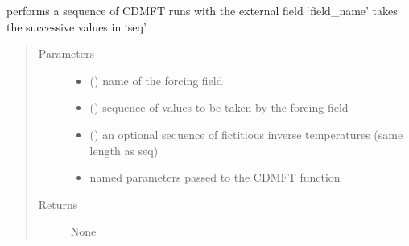 \documentclass[letterpaper,10pt,english]{sphinxmanual}
\begin{document}
\begin{fulllineitems}
\label{\detokenize{cdmft:pyqcm.cdmft.cdmft_forcing}}
\sphinxAtStartPar
performs a sequence of CDMFT runs with the external field ‘field\_name’ takes the successive values in ‘seq’
\begin{quote}\begin{description}
\item[{Parameters}] \leavevmode\begin{itemize}
\item {} 
\sphinxAtStartPar
{} () \textendash{} name of the forcing field

\item {} 
\sphinxAtStartPar
{} (\sphinxstyleliteralemphasis{\sphinxupquote{{[}}}\sphinxstyleliteralemphasis{\sphinxupquote{{]}}}) \textendash{} sequence of values to be taken by the forcing field

\item {} 
\sphinxAtStartPar
{} (\sphinxstyleliteralemphasis{\sphinxupquote{{[}}}\sphinxstyleliteralemphasis{\sphinxupquote{{]}}}) \textendash{} an optional sequence of fictitious inverse temperatures (same length as seq)

\item {} 
\sphinxAtStartPar
{} \textendash{} named parameters passed to the CDMFT function

\end{itemize}

\item[{Returns}] \leavevmode
\sphinxAtStartPar
None

\end{description}\end{quote}

\end{fulllineitems}
\end{document}
